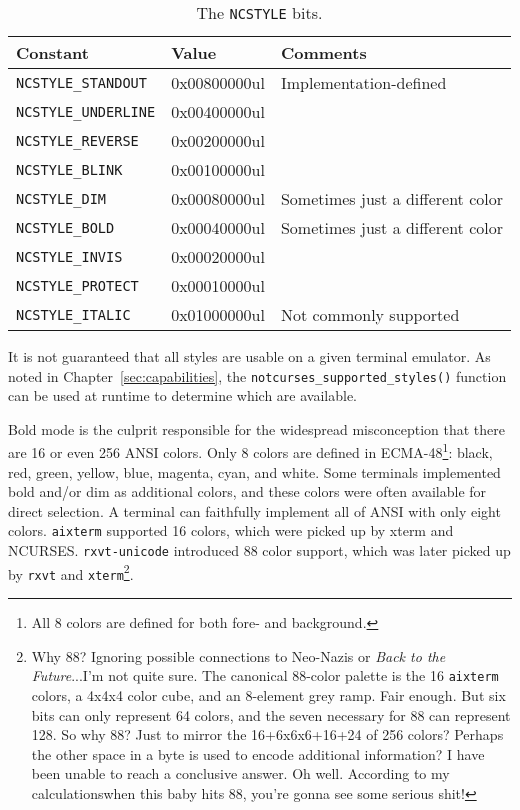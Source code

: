 \begin{table}[!htb]
  \centering
  \begin{tabular}{|l|l|l|}
    \hline
    Constant & Value & Comments \\
    \hline
    \hline
\texttt{NCSTYLE\_STANDOUT} &  0x00800000ul & Implementation-defined \\
\texttt{NCSTYLE\_UNDERLINE} & 0x00400000ul & \\
\texttt{NCSTYLE\_REVERSE} &   0x00200000ul & \\
\texttt{NCSTYLE\_BLINK} &     0x00100000ul & \\
\texttt{NCSTYLE\_DIM} &       0x00080000ul & Sometimes just a different color \\
\texttt{NCSTYLE\_BOLD} &      0x00040000ul & Sometimes just a different color \\
\texttt{NCSTYLE\_INVIS} &     0x00020000ul & \\
\texttt{NCSTYLE\_PROTECT} &   0x00010000ul & \\
\texttt{NCSTYLE\_ITALIC} &    0x01000000ul & Not commonly supported \\
    \hline
  \end{tabular}
  \caption{The \texttt{NCSTYLE} bits.}
  \label{table:styles}
\end{table}

It is not guaranteed that all styles are usable on a given terminal emulator.
As noted in Chapter~\ref{sec:capabilities}, the \texttt{notcurses\_supported\_styles()}
function can be used at runtime to determine which are available. 

Bold mode is the culprit responsible for the widespread misconception that there
are 16 or even 256 ANSI colors. Only 8 colors are defined in
ECMA-48\footnote{All 8 colors are defined for both fore- and background.}:
black, red, green, yellow, blue, magenta, cyan, and white. Some terminals
implemented bold and/or dim as additional colors, and these colors were often
available for direct selection. A terminal can faithfully implement all of ANSI
with only eight colors. \texttt{aixterm} supported 16 colors, which were
picked up by xterm and NCURSES. \texttt{rxvt-unicode} introduced 88 color support, which
was later picked up by \texttt{rxvt} and \texttt{xterm}\footnote{Why 88? Ignoring
possible connections to Neo-Nazis or \textit{Back to the Future}...I'm not quite
sure. The canonical 88-color palette is the 16 \texttt{aixterm} colors, a 4x4x4
color cube, and an 8-element grey ramp. Fair enough. But six bits can only represent
64 colors, and the seven necessary for 88 can represent 128. So why 88? Just to
mirror the 16+6x6x6+16+24 of 256 colors? Perhaps the other space in a byte is
used to encode additional information? I have been unable to reach a conclusive
answer. Oh well. According to my calculations\textellipsis when this baby hits 88, you're gonna see some serious shit!}.

